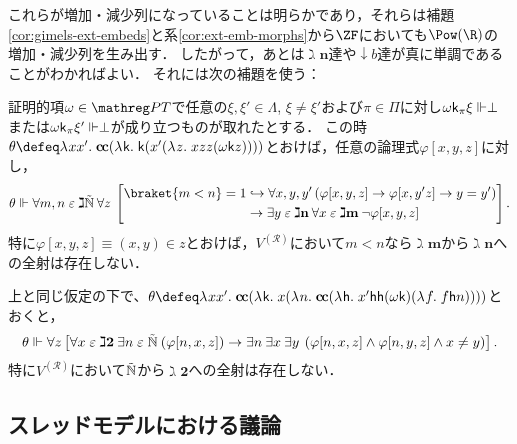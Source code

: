 \documentclass[realisability.tex]{subfiles}
\begin{document}
これらが増加・減少列になっていることは明らかであり，それらは補題\ref{cor:gimels-ext-embeds}と系\ref{cor:ext-emb-morphs}から$\ZF$においても$\Pow(\R)$の増加・減少列を生み出す．
したがって，あとは$\gimel \mathbf{n}$達や$\downarrow b$達が真に単調であることがわかればよい．
それには次の補題を使う：

\begin{lemma}
 証明的項$\omega \in \PT$で任意の$\xi, \xi' \in \Lambda$, $\xi \neq \xi'$および$\pi \in \Pi$に対し$\omega \mathsf{k}_\pi \xi \Vdash \perp$または$\omega\mathsf{k}_\pi \xi' \Vdash \perp$が成り立つものが取れたとする．
 この時$\theta \defeq \abs{x x'}{\cc (\abs{\conti}{\conti (x'(\abs{z}{xzz(\omega \conti z)}))})}$とおけば，任意の論理式$\varphi[x,y,z]$に対し，
 \[
  \theta \Vdash \forall m, n \strin \gimel \NN\: \forall z \:
   \left[\begin{split}
          \braket{m < n} = 1 &\hookrightarrow
          \forall x, y, y' \left( \varphi[x,y,z] \to \varphi[x, y' z] \to y = y'\right)\\
         &\to \exists y \strin \gimel\mathbf{n} \: \forall x \strin \gimel \mathbf{m} \: \neg \varphi[x,y,z]
  \end{split}\right].
 \]
 特に$\varphi[x, y, z] \equiv (x, y) \in z$とおけば，$V^{(\mathcal{R})}$において$m < n$なら$\gimel \mathbf{m}$から$\gimel \mathbf{n}$への全射は存在しない．
\end{lemma}

\begin{lemma}
 上と同じ仮定の下で、$\theta \defeq \abs{x x'}{\cc(\abs{\conti}{x(\abs{n}{\cc(\abs{\mathsf{h}}{x'\mathsf{h}\mathsf{h}(\omega \conti)(\abs{f}{f\mathsf{h}n})})})})}$とおくと，
 \[
 \theta \Vdash \forall z \left[ \forall x \mathrel{\varepsilon} \gimel \mathbf{2} \: \exists n \mathrel{\varepsilon} \mathord{\tilde{\mathbb{N}}} \: ( \varphi[n, x, z]) \to \exists n\: \exists x\: \exists y\: \left(\varphi[n, x, z] \land  \varphi[n, y, z] \land x \neq y\right)  \right].
 \]
 特に$V^{(\mathcal{R})}$において$\mathord{\tilde{\mathbb{N}}}$から$\gimel \mathbf{2}$への全射は存在しない．
\end{lemma}


\subsection{スレッドモデルにおける議論}
\end{document}
